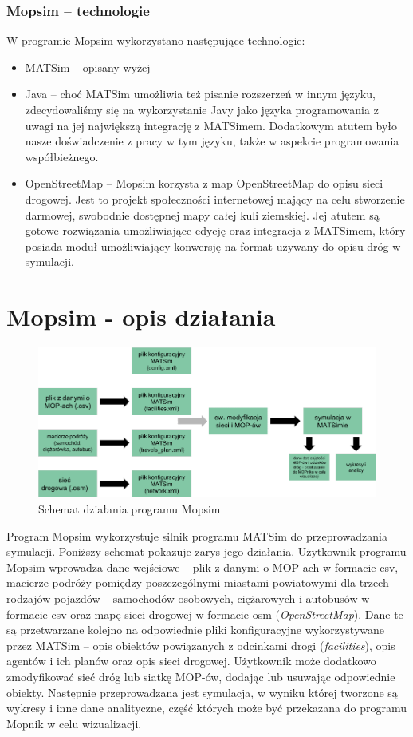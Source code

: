 \subsubsection{Mopsim -- technologie}
W programie Mopsim wykorzystano następujące technologie:
\begin{itemize}
\item MATSim -- opisany wyżej
\item Java -- choć MATSim umożliwia też pisanie rozszerzeń w innym języku, zdecydowaliśmy się na wykorzystanie Javy jako języka programowania z uwagi na jej największą integrację z MATSimem. Dodatkowym atutem było nasze doświadczenie z pracy w tym języku, także w aspekcie programowania współbieżnego.
\item OpenStreetMap -- Mopsim korzysta z map OpenStreetMap do opisu sieci drogowej. Jest to projekt społeczności internetowej mający na celu stworzenie darmowej, swobodnie dostępnej mapy całej kuli ziemskiej. Jej atutem są gotowe rozwiązania umożliwiające edycję oraz integracja z MATSimem, który posiada moduł umożliwiający konwersję na format używany do opisu dróg w symulacji.
\end{itemize}
\section{Mopsim - opis działania}
    \begin{figure}[h]
        \caption{Schemat działania programu Mopsim}
        \includegraphics[width=\textwidth]{images/mopsim/mopsim-workflow.png}
    \end{figure}
Program Mopsim wykorzystuje silnik programu MATSim do przeprowadzania symulacji. Poniższy schemat pokazuje zarys jego działania. Użytkownik programu Mopsim wprowadza dane wejściowe -- plik z danymi o MOP-ach w formacie csv, macierze podróży pomiędzy poszczególnymi miastami powiatowymi dla trzech rodzajów pojazdów -- samochodów osobowych, ciężarowych i autobusów w formacie csv oraz mapę sieci drogowej w formacie osm (\textit{OpenStreetMap}). Dane te są przetwarzane kolejno na odpowiednie pliki konfiguracyjne wykorzystywane przez MATSim -- opis obiektów powiązanych z odcinkami drogi (\textit{facilities}), opis agentów i ich planów oraz opis sieci drogowej. Użytkownik może dodatkowo zmodyfikować sieć dróg lub siatkę MOP-ów, dodając lub usuwając odpowiednie obiekty. Następnie przeprowadzana jest symulacja, w wyniku której tworzone są wykresy i inne dane analityczne, część których może być przekazana do programu Mopnik w celu wizualizacji.

